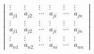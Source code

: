 \documentclass[
]{article}
\begin{document}
\begin{equation}
\begin{array}{ccccc}
\begin{vmatrix}
     \vdots        & \vdots   & \vdots     &  \vdots      & \vdots     & \vdots      \\  
     a_{j1}        & a_{j2}   &\cdots      & a_{ji}       & \cdots     & a_{jn}      \\
     \vdots        & \vdots   & \vdots     &  \vdots      & \vdots     & \vdots      \\  
     a_{j1}        & a_{j2}   & \cdots     & a_{ji}       & \cdots     & a_{jn}      \\
      \vdots       & \vdots   & \vdots     &  \vdots      & \vdots     & \vdots      \\
      a_{n1}        & a_{n2}   & \cdots     & a_{ni}       & \cdots     & a_{nn} 
  \end{vmatrix}
\end{array}
\end{equation}
\end{document}
